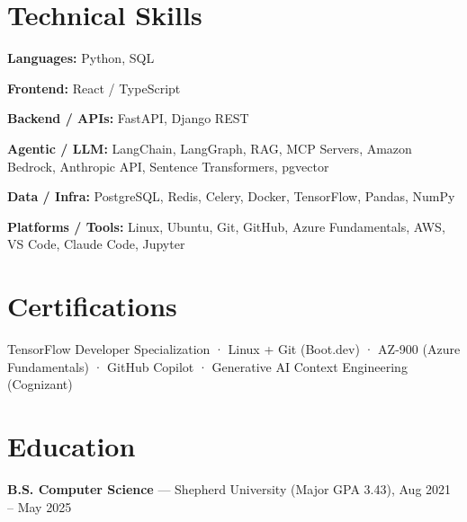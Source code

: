 \documentclass[10pt]{article}
\begin{document}
\section*{Technical Skills}
\noindent \textbf{Languages:} Python, SQL\par
\noindent \textbf{Frontend:} React / TypeScript\par
\noindent \textbf{Backend / APIs:} FastAPI, Django REST\par
\noindent \textbf{Agentic / LLM:} LangChain, LangGraph, RAG, MCP Servers, Amazon Bedrock, Anthropic API, Sentence Transformers, pgvector\par
\noindent \textbf{Data / Infra:} PostgreSQL, Redis, Celery, Docker, TensorFlow, Pandas, NumPy\par
\noindent \textbf{Platforms / Tools:} Linux, Ubuntu, Git, GitHub, Azure Fundamentals, AWS, VS Code, Claude Code, Jupyter\par
\section*{Certifications}
\noindent TensorFlow Developer Specialization · Linux + Git (Boot.dev) · AZ-900 (Azure Fundamentals) · GitHub Copilot · Generative AI Context Engineering (Cognizant)\par
\section*{Education}
\noindent \textbf{B.S. Computer Science} — Shepherd University (Major GPA 3.43), Aug 2021 – May 2025\par
\end{document}
